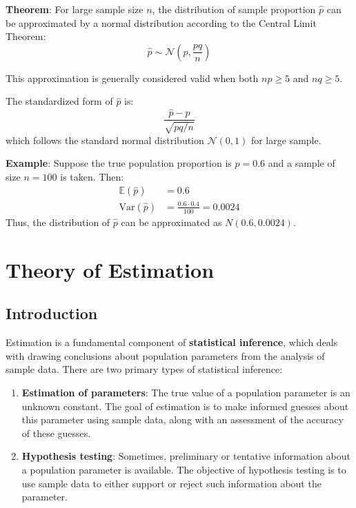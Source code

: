 \documentclass[twoside]{book}
\begin{document}
\begin{textbox}
    \textbf{Theorem}: For large sample size \( n \), the distribution of sample proportion \( \hat{p} \) can be approximated by a normal distribution according to the Central Limit Theorem:
    \[
    \hat{p} \sim \mathcal{N}\left(p, \frac{pq}{n}\right)
    \]
\end{textbox}
This approximation is generally considered valid when both \( np \geq 5 \) and \( nq \geq 5 \).

The standardized form of \( \hat{p} \) is:
\[
\frac{\hat{p} - p}{\sqrt{pq/n}}
\]
which follows the standard normal distribution $\mathcal{N}\left(0, 1\right)$ for large sample.

\textbf{Example}: Suppose the true population proportion is \( p = 0.6 \) and a sample of size \( n = 100 \) is taken. Then:
\begin{align*}
\mathbb{E}\left( \hat{p}\right) &= 0.6 \\
\textrm{Var}(\hat{p}) &= \frac{0.6 \cdot 0.4}{100} = 0.0024
\end{align*}
Thus, the distribution of \( \hat{p} \) can be approximated as \( N(0.6, 0.0024) \).




\chapter{Theory of Estimation}

\section{Introduction}
Estimation is a fundamental component of \textbf{statistical inference}, which deals with drawing conclusions about population parameters from the analysis of sample data. There are two primary types of statistical inference:

\begin{enumerate}
    \item \textbf{Estimation of parameters}: The true value of a population parameter is an unknown constant. The goal of estimation is to make informed guesses about this parameter using sample data, along with an assessment of the accuracy of these guesses.

    \item \textbf{Hypothesis testing}: Sometimes, preliminary or tentative information about a population parameter is available. The objective of hypothesis testing is to use sample data to either support or reject such information about the parameter.
\end{enumerate}
\end{document}
